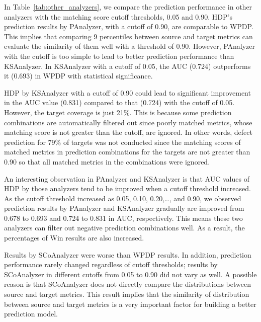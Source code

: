 In Table~\ref{tab:other_analyzers}, we compare the prediction performance in
other analyzers with the matching score cutoff thresholds, 0.05 and 0.90.
HDP's prediction results by PAnalyzer, with a cutoff of 0.90, are
comparable to WPDP. This
implies that comparing 9 percentiles between source and target metrics can
evaluate the similarity of them well with a threshold of 0.90. However,
PAnalyzer with the cutoff is
too simple to lead to better prediction performance than KSAnalyzer. In
KSAnalyzer with a cutoff of 0.05, the AUC (0.724) outperforms it (0.693) in WPDP
with statistical significance.

HDP by KSAnalyzer with a cutoff of 0.90 could lead to significant
improvement in the AUC value (0.831) compared to that (0.724) with the
cutoff of 0.05.
However, the target coverage is just 21\%. This is because some prediction
combinations are automatically filtered out since poorly matched metrics, whose
matching score is not greater than the cutoff, are ignored. In other words,
defect prediction for 79\% of targets was not
conducted since the matching scores of matched metrics in prediction
combinations for the targets are not greater than 0.90 so
that all matched metrics in the combinations were ignored.

An interesting observation in PAnalyzer and KSAnalyzer is that AUC
values of HDP by those analyzers tend to be improved when a cutoff threshold
increased. As the cutoff threshold increased as 0.05, 0.10, 0.20,\ldots, and
0.90, we observed prediction results by PAnalyzer and KSAnalyzer
gradually are improved from 0.678 to 0.693 and 0.724 to 0.831 in AUC, respectively.
This means these two analyzers can filter out negative prediction combinations
well. As a result, the percentages of Win results are also increased.

Results by SCoAnalyzer were
worse than WPDP results. In addition,
prediction performance rarely changed regardless of cutoff thresholds; results
by SCoAnalyzer in different cutoffs from 0.05 to 0.90 did not
vary as well.
A possible reason is that SCoAnalyzer does not directly compare
the distributions between source and target metrics.
This result implies that the similarity of distribution between source and
target metrics is a very important factor for building a better
prediction model.


